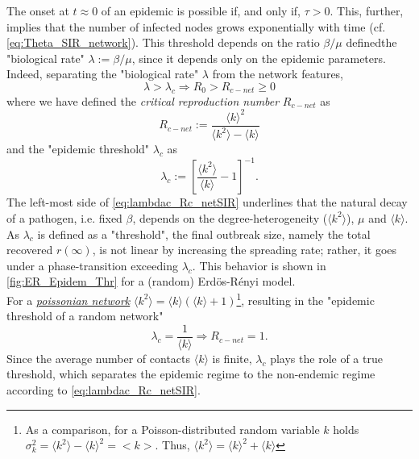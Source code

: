 \documentclass[a4paper,10pt,twoside]{book} %
\theoremstyle{definition}
\begin{document}
The onset at $t \approx 0$  of an epidemic is possible if, and only if, $\tau > 0$. This, further, implies that the number of infected nodes grows exponentially with time (cf. \autoref{eq:Theta_SIR_network}). This threshold depends on the ratio $\beta / \mu$ definedthe "biological rate" $ \lambda := \beta/ \mu$, since it depends only on the epidemic parameters.  
Indeed, separating the "biological rate" $\lambda$ from the network features, 
\begin{equation}
	\lambda > 
	\lambda_c
	\Rightarrow
	R_0 > R_{c-net} \geq 0
	\label{eq:lambdac_Rc_netSIR}
\end{equation}
where we have defined the \textit{critical reproduction number}  $ R_{c-net}$ as
\begin{equation}
	R_{c-net} := \frac{ \langle k \rangle^2 }{\langle k^2 \rangle-\langle k \rangle}
	\label{eq:def_R_cnet}
\end{equation}
and the "epidemic threshold" $ \lambda_c$ as
\begin{equation}
	\lambda_c:=\left[ \frac{\langle k^2 \rangle}{\langle k \rangle} - 1\right]^{-1}.
	\label{eq:def_lambdac}
\end{equation}
The left-most side of \autoref{eq:lambdac_Rc_netSIR} underlines that the natural decay of a pathogen, i.e. fixed $ \beta$, depends on the degree-heterogeneity ($\langle k^2 \rangle$), $ \mu$  and $\langle k \rangle$. \\ 
As $\lambda_c$ is defined as a "threshold", the final outbreak size, namely the total recovered $r(\infty)$, is not linear by increasing the spreading rate; rather, it goes under a phase-transition exceeding $\lambda_c$. This behavior is shown in \autoref{fig:ER_Epidem_Thr} for a (random) Erdös-Rényi model. 
\\For a \underline{\textit{poissonian network}} $\langle k^2 \rangle = \langle k \rangle (\langle k \rangle + 1 )$\footnote{As a comparison, for a Poisson-distributed random variable $k$ holds $\sigma_k^2 = \langle k^2 \rangle - \langle k \rangle^2 = <k>$. Thus, $\langle k^2 \rangle = \langle k \rangle^2 + \langle k \rangle$}, 
resulting in the "epidemic threshold of a random network" \cite{barabasi::2016networkbook}
\[ \lambda_c = 
	\frac{1}{\langle k \rangle} \Rightarrow R_{c-net} = 1.
	\label{eq:Rcnet=1}
\]
Since the average number of contacts $\langle k \rangle$ is finite, $\lambda_c$ plays the role of a true threshold, which separates the epidemic regime to the non-endemic regime according to \autoref{eq:lambdac_Rc_netSIR}.
\end{document}
